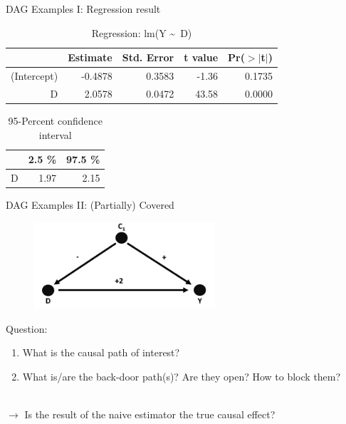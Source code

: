\documentclass{beamer}\usepackage[]{graphicx}\usepackage[]{color}
\begin{document}
\begin{frame}[fragile]{DAG Examples I: Regression result}
\begin{table}[ht]
\centering
\begin{tabular}{rrrrr}
  \hline
 & Estimate & Std. Error & t value & Pr($>$$|$t$|$) \\ 
  \hline
(Intercept) & -0.4878 & 0.3583 & -1.36 & 0.1735 \\ 
  D & 2.0578 & 0.0472 & 43.58 & 0.0000 \\ 
   \hline
\end{tabular}
\caption{Regression: lm(Y \textasciitilde ~D)} 
\end{table}
\begin{table}[ht]
\centering
\begin{tabular}{rrr}
  \hline
 & 2.5 \% & 97.5 \% \\ 
  \hline
D & 1.97 & 2.15 \\ 
   \hline
\end{tabular}
\caption{95-Percent confidence interval} 
\end{table}

\end{frame}





\begin{frame}{DAG Examples II: (Partially) Covered}
\\[1em]
\begin{figure}
\includegraphics[width=0.6\textwidth]{Graphics/2.SimpleConfounding-Covered.png}
\end{figure}
Question:
\begin{enumerate}
\item What is the causal path of interest?
\item What is/are the back-door path(s)? Are they open? How to block them?
\end{enumerate}
\\[1em]
$\rightarrow$ Is the result of the naive estimator the true causal effect?
\end{frame}
\end{document}
